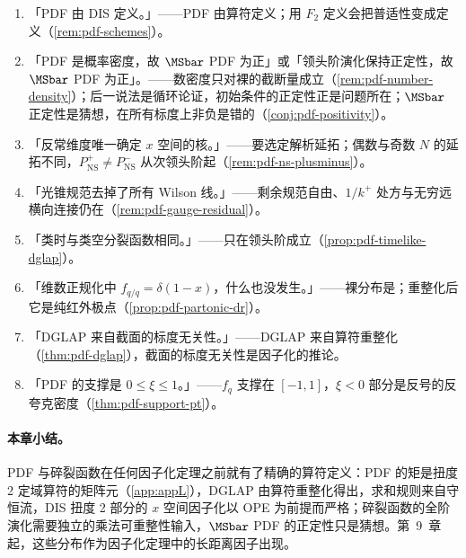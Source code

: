 \begin{tcolorbox}[enhanced,breakable,title=本章澄清的常见误解,fonttitle=\bfseries,
  colback=gray!3!white,colframe=gray!55!black,boxrule=0.6pt,arc=2pt,
  left=5pt,right=5pt,top=3pt,bottom=3pt,before skip=8pt,after skip=6pt]
\begin{enumerate}[leftmargin=1.6em,itemsep=1pt,topsep=1pt,label=\arabic*.]
\item 「PDF 由 DIS 定义。」——PDF 由算符定义；用 $F_2$ 定义会把普适性变成定义（\cref{rem:pdf-schemes}）。
\item 「PDF 是概率密度，故 $\MSbar$ PDF 为正」或「领头阶演化保持正定性，故 $\MSbar$ PDF 为正」。——数密度只对裸的截断量成立（\cref{rem:pdf-number-density}）；后一说法是循环论证，初始条件的正定性正是问题所在；$\MSbar$ 正定性是猜想，在所有标度上非负是错的（\cref{conj:pdf-positivity}）。
\item 「反常维度唯一确定 $x$ 空间的核。」——要选定解析延拓；偶数与奇数 $N$ 的延拓不同，$P^+_{\mathrm{NS}}\ne P^-_{\mathrm{NS}}$ 从次领头阶起（\cref{rem:pdf-ns-plusminus}）。
\item 「光锥规范去掉了所有 Wilson 线。」——剩余规范自由、$1/k^+$ 处方与无穷远横向连接仍在（\cref{rem:pdf-gauge-residual}）。
\item 「类时与类空分裂函数相同。」——只在领头阶成立（\cref{prop:pdf-timelike-dglap}）。
\item 「维数正规化中 $f_{q/q}=\delta(1-x)$，什么也没发生。」——裸分布是；重整化后它是纯红外极点（\cref{prop:pdf-partonic-dr}）。
\item 「DGLAP 来自截面的标度无关性。」——DGLAP 来自算符重整化（\cref{thm:pdf-dglap}），截面的标度无关性是因子化的推论。
\item 「PDF 的支撑是 $0\le\xi\le1$。」——$f_q$ 支撑在 $[-1,1]$，$\xi<0$ 部分是反号的反夸克密度（\cref{thm:pdf-support-pt}）。
\end{enumerate}
\end{tcolorbox}

\paragraph{本章小结。}
PDF 与碎裂函数在任何因子化定理之前就有了精确的算符定义：PDF 的矩是扭度 2 定域算符的矩阵元（\cref{app:appL}），DGLAP 由算符重整化得出，求和规则来自守恒流，DIS 扭度 2 部分的 $x$ 空间因子化以 OPE 为前提而严格；碎裂函数的全阶演化需要独立的乘法可重整性输入，$\MSbar$ PDF 的正定性只是猜想。第~9~章起，这些分布作为因子化定理中的长距离因子出现。
